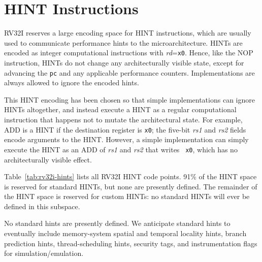 \section{HINT Instructions}
\label{sec:rv32i-hints}

RV32I reserves a large encoding space for HINT instructions, which are
usually used to communicate performance hints to the
microarchitecture.  HINTs are encoded as integer computational
instructions with {\em rd}={\tt x0}.  Hence, like the NOP instruction,
HINTs do not change any architecturally visible state, except for
advancing the {\tt pc} and any applicable performance counters.
Implementations are always allowed to ignore the encoded hints.

\begin{commentary}
This HINT encoding has been chosen so that simple implementations can ignore
HINTs altogether, and instead execute a HINT as a regular computational
instruction that happens not to mutate the architectural state.  For example, ADD is
a HINT if the destination register is {\tt x0}; the five-bit {\em rs1} and {\em
rs2} fields encode arguments to the HINT.  However, a simple implementation can
simply execute the HINT as an ADD of {\em rs1} and {\em rs2} that writes {\tt
x0}, which has no architecturally visible effect.
\end{commentary}

Table~\ref{tab:rv32i-hints} lists all RV32I HINT code points.  91\% of the HINT
space is reserved for standard HINTs, but none are presently defined.  The
remainder of the HINT space is reserved for custom HINTs: no standard HINTs
will ever be defined in this subspace.

\begin{commentary}
No standard hints are presently defined.  We anticipate
standard hints to eventually include memory-system spatial and
temporal locality hints, branch prediction hints, thread-scheduling
hints, security tags, and instrumentation flags for
simulation/emulation.
\end{commentary}

